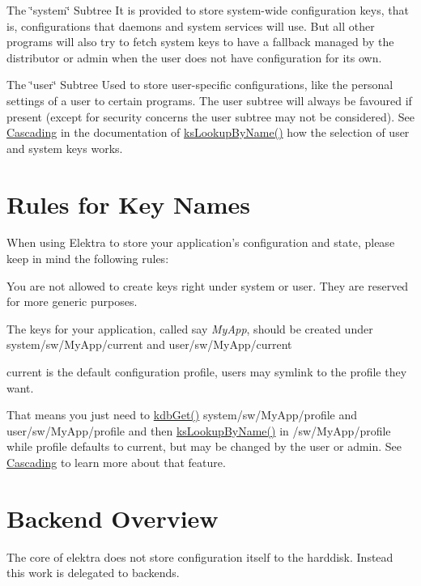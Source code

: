\begin{DoxyItemize}
\item The \char`\"{}system\char`\"{} Subtree It is provided to store system-\/wide configuration keys, that is, configurations that daemons and system services will use. But all other programs will also try to fetch system keys to have a fallback managed by the distributor or admin when the user does not have configuration for its own.
\end{DoxyItemize}


\begin{DoxyItemize}
\item The \char`\"{}user\char`\"{} Subtree Used to store user-\/specific configurations, like the personal settings of a user to certain programs. The user subtree will always be favoured if present (except for security concerns the user subtree may not be considered). See \hyperlink{group__keyset_cascading}{Cascading} in the documentation of \hyperlink{group__keyset_gad2e30fb6d4739d917c5abb2ac2f9c1a1}{ksLookupByName()} how the selection of user and system keys works.
\end{DoxyItemize}\hypertarget{index_rules}{}\section{Rules for Key Names}\label{index_rules}
When using Elektra to store your application's configuration and state, please keep in mind the following rules:
\begin{DoxyItemize}
\item You are not allowed to create keys right under {\ttfamily system} or {\ttfamily user}. They are reserved for more generic purposes.
\item The keys for your application, called say {\itshape MyApp\/}, should be created under {\ttfamily system/sw/MyApp/current} and {\ttfamily user/sw/MyApp/current} 
\item current is the default configuration profile, users may symlink to the profile they want.
\item That means you just need to \hyperlink{group__kdb_ga28e385fd9cb7ccfe0b2f1ed2f62453a1}{kdbGet()} {\ttfamily system/sw/MyApp/profile} and {\ttfamily user/sw/MyApp/profile} and then \hyperlink{group__keyset_gad2e30fb6d4739d917c5abb2ac2f9c1a1}{ksLookupByName()} in {\ttfamily /sw/MyApp/profile} while profile defaults to current, but may be changed by the user or admin. See \hyperlink{group__keyset_cascading}{Cascading} to learn more about that feature.
\end{DoxyItemize}\hypertarget{index_backendsoverview}{}\section{Backend Overview}\label{index_backendsoverview}
The core of elektra does not store configuration itself to the harddisk. Instead this work is delegated to backends.


